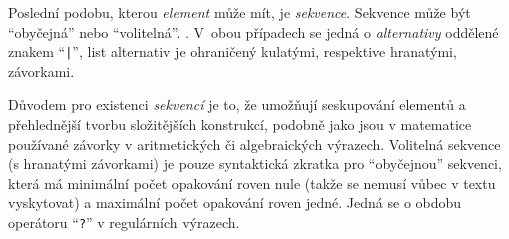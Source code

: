 Poslední podobu, kterou \emph{element} může mít, je \emph{sekvence}.
Sekvence může být \enquote{obyčejná} nebo \enquote{volitelná}.
.
V~obou případech se jedná o \emph{alternativy} oddělené znakem \enquote{\texttt{|}},
list alternativ je ohraničený kulatými, respektive hranatými, závorkami.

Důvodem pro existenci \emph{sekvencí} je to, že umožňují seskupování elementů a přehlednější tvorbu složitějších konstrukcí,
podobně jako jsou v matematice používané závorky v aritmetických či algebraických výrazech.
Volitelná sekvence (s hranatými závorkami) je pouze syntaktická zkratka pro \enquote{obyčejnou} sekvenci,
která má minimální počet opakování roven nule (takže se nemusí vůbec v textu vyskytovat) a
maximální počet opakování roven jedné.
Jedná se o obdobu operátoru \enquote{\texttt{?}} v regulárních výrazech.

